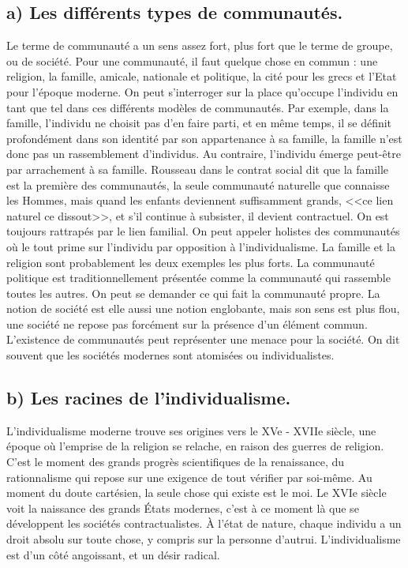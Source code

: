 \documentclass[12pt]{article}
\begin{document}
\subsection*{a) Les différents types de communautés.}
Le terme de communauté a un sens assez fort, plus fort que le terme de groupe, ou de société. Pour une communauté, il faut quelque chose en commun : une religion, la famille, amicale, nationale et politique, la cité pour les grecs et l'Etat pour l'époque moderne.
On peut s'interroger sur la place qu'occupe l'individu en tant que tel dans ces différents modèles de communautés.
Par exemple, dans la famille, l'individu ne choisit pas d'en faire parti, et en même temps, il se définit profondément dans son identité par son appartenance à sa famille, la famille n'est donc pas un rassemblement d'individus.
Au contraire, l'individu émerge peut-être par arrachement à sa famille.
Rousseau dans le contrat social dit que la famille est la première des communautés, la seule communauté naturelle que connaisse les Hommes, mais quand les enfants deviennent suffisamment grands, <<ce lien naturel ce dissout>>, et s'il continue à subsister, il devient contractuel.
On est toujours rattrapés par le lien familial.
On peut appeler holistes des communautés où le tout prime sur l'individu par opposition à l'individualisme. La famille et la religion sont probablement les deux exemples les plus forts. La communauté politique est traditionnellement présentée comme la communauté qui rassemble toutes les autres. On peut se demander ce qui fait la communauté propre.
La notion de société est elle aussi une notion englobante, mais son sens est plus flou, une société ne repose pas forcément sur la présence d'un élément commun. L'existence de communautés peut représenter une menace pour la société. On dit souvent que les sociétés modernes sont atomisées ou individualistes.
\subsection*{b) Les racines de l'individualisme.}
L'individualisme moderne trouve ses origines vers le XVe - XVIIe siècle, une époque où l'emprise de la religion se relache, en raison des guerres de religion. C'est le moment des grands progrès scientifiques de la renaissance, du rationnalisme qui repose sur une exigence de tout vérifier par soi-même. Au moment du doute cartésien, la seule chose qui existe est le moi.
Le XVIe siècle voit la naissance des grands États modernes, c'est à ce moment là que se développent les sociétés contractualistes. À l'état de nature, chaque individu a un droit absolu sur toute chose, y compris sur la personne d'autrui. L'individualisme est d'un côté angoissant, et un désir radical. 
\end{document}
